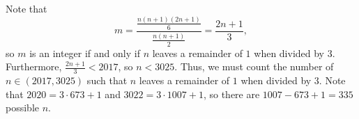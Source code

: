 Note that \[m=\frac{\frac{n\left(n+1\right)\left(2n+1\right)}{6}}{\frac{n\left(n+1\right)}{2}}=\frac{2n+1}{3},\] so $m$ is an integer if and only if $n$ leaves a remainder of $1$ when divided by $3$. Furthermore, $\frac{2n+1}{3}<2017$, so $n<3025$. Thus, we must count the number of $n\in\left(2017,3025\right)$ such that $n$ leaves a remainder of $1$ when divided by $3$. Note that $2020=3\cdot673+1$ and $3022=3\cdot1007+1$, so there are $1007-673+1=\boxed{335}$ possible $n$.